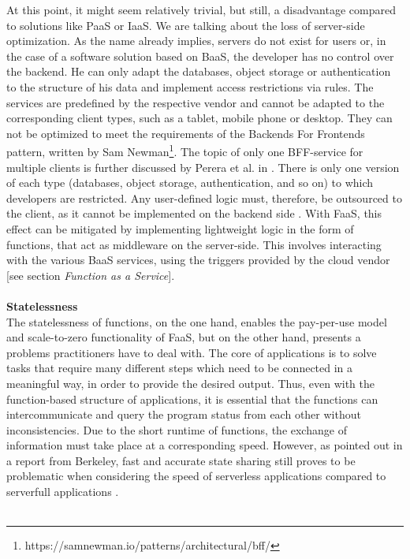 \documentclass[11pt]{article}
\begin{document}
At this point, it might seem relatively trivial, but still, a disadvantage compared to solutions like PaaS or IaaS. We are talking about the loss of server-side optimization. As the name already implies, servers do not exist for users or, in the case of a software solution based on BaaS, the developer has no control over the backend. He can only adapt the databases, object storage or authentication to the structure of his data and implement access restrictions via rules. The services are predefined by the respective vendor and cannot be adapted to the corresponding client types, such as a tablet, mobile phone or desktop. They can not be optimized to meet the requirements of the \glqq Backends For Frontends\grqq{} pattern, written by Sam Newman\footnote{https://samnewman.io/patterns/architectural/bff/}. The topic of only one BFF-service for multiple clients is further discussed by Perera et al. in \cite{perera2018rule}. There is only one version of each type (databases, object storage, authentication, and so on) to which developers are restricted. Any user-defined logic must, therefore, be outsourced to the client, as it cannot be implemented on the backend side \cite{fowler2018serverless}. With FaaS, this effect can be mitigated by implementing lightweight logic in the form of functions, that act as middleware on the server-side. This involves interacting with the various BaaS services, using the triggers provided by the cloud vendor [see section \textit{Function as a Service}].\\\\ 
\textbf{Statelessness}\\
The statelessness of functions, on the one hand, enables the pay-per-use model and scale-to-zero functionality of FaaS, but on the other hand, presents a problems practitioners have to deal with. The core of applications is to solve tasks that require many different steps which need to be connected in a meaningful way, in order to provide the desired output. Thus, even with the function-based structure of applications, it is essential that the functions can intercommunicate and query the program status from each other without inconsistencies. Due to the short runtime of functions, the exchange of information must take place at a corresponding speed. However, as pointed out in a report from Berkeley, fast and accurate state sharing still proves to be problematic when considering the speed of serverless applications compared to serverfull applications \cite{jonas2019cloud}.\\\\ 
\end{document}
